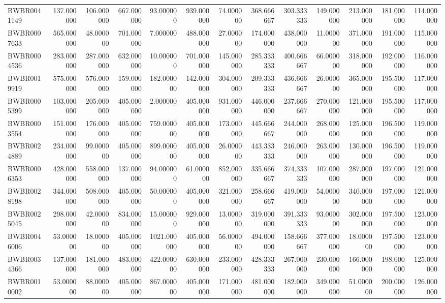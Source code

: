 \begin{longtable}{lrrrrrrrrrrrr}
BWBR0041149 & 137.000000 & 106.000000 & 667.000000 & 93.000000 & 939.000000 & 74.000000 & 368.666667 & 303.333333 & 149.000000 & 213.000000 & 181.000000 & 114.000000 \\
BWBR0007633 & 565.000000 & 48.000000 & 701.000000 & 7.000000 & 488.000000 & 27.000000 & 174.000000 & 438.000000 & 11.000000 & 371.000000 & 191.000000 & 115.000000 \\
BWBR0004536 & 283.000000 & 287.000000 & 632.000000 & 10.000000 & 701.000000 & 145.000000 & 285.333333 & 400.666667 & 66.000000 & 318.000000 & 192.000000 & 116.000000 \\
BWBR0019919 & 575.000000 & 576.000000 & 159.000000 & 182.000000 & 142.000000 & 304.000000 & 209.333333 & 436.666667 & 26.000000 & 365.000000 & 195.500000 & 117.000000 \\
BWBR0005399 & 103.000000 & 205.000000 & 405.000000 & 2.000000 & 405.000000 & 931.000000 & 446.000000 & 237.666667 & 270.000000 & 121.000000 & 195.500000 & 117.000000 \\
BWBR0003554 & 151.000000 & 176.000000 & 405.000000 & 759.000000 & 405.000000 & 173.000000 & 445.666667 & 244.000000 & 268.000000 & 125.000000 & 196.500000 & 119.000000 \\
BWBR0024889 & 234.000000 & 99.000000 & 405.000000 & 899.000000 & 405.000000 & 26.000000 & 443.333333 & 246.000000 & 263.000000 & 130.000000 & 196.500000 & 119.000000 \\
BWBR0006353 & 428.000000 & 558.000000 & 137.000000 & 94.000000 & 61.000000 & 852.000000 & 335.666667 & 374.333333 & 107.000000 & 287.000000 & 197.000000 & 121.000000 \\
BWBR0028198 & 344.000000 & 508.000000 & 405.000000 & 50.000000 & 405.000000 & 321.000000 & 258.666667 & 419.000000 & 54.000000 & 340.000000 & 197.000000 & 121.000000 \\
BWBR0025045 & 298.000000 & 42.000000 & 834.000000 & 15.000000 & 929.000000 & 13.000000 & 319.000000 & 391.333333 & 93.000000 & 302.000000 & 197.500000 & 123.000000 \\
BWBR0046006 & 53.000000 & 18.000000 & 405.000000 & 1021.000000 & 405.000000 & 56.000000 & 494.000000 & 158.666667 & 377.000000 & 18.000000 & 197.500000 & 123.000000 \\
BWBR0034366 & 137.000000 & 181.000000 & 483.000000 & 422.000000 & 630.000000 & 233.000000 & 428.333333 & 267.000000 & 230.000000 & 166.000000 & 198.000000 & 125.000000 \\
BWBR0010002 & 53.000000 & 88.000000 & 405.000000 & 867.000000 & 405.000000 & 171.000000 & 481.000000 & 182.000000 & 349.000000 & 51.000000 & 200.000000 & 126.000000 \\

\end{longtable}
